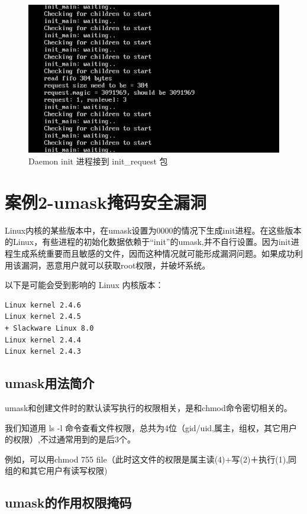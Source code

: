 \begin{figure}[htbp]
\centering
\includegraphics{./pictures/hack-init-fifo.png}
\caption{Daemon init 进程接到 init\_request 包}
\end{figure}

\section{案例2-umask掩码安全漏洞}

Linux内核的某些版本中，在umask设置为0000的情况下生成init进程。在这些版本的Linux，有些进程的初始化数据依赖于``init''的umask,并不自行设置。因为init进程生成系统重要而且敏感的文件，因而这种情况就可能形成漏洞问题。如果成功利用该漏洞，恶意用户就可以获取root权限，并破坏系统。

以下是可能会受到影响的 Linux 内核版本：

{\begin{shaded}\begin{verbatim}
Linux kernel 2.4.6
Linux kernel 2.4.5
+ Slackware Linux 8.0
Linux kernel 2.4.4
Linux kernel 2.4.3
\end{verbatim}\end{shaded}}
\subsection{umask用法简介}

umask和创建文件时的默认读写执行的权限相关，是和chmod命令密切相关的。

我们知道用 ls -l
命令查看文件权限，总共为4位（gid/uid,属主，组权，其它用户的权限）,不过通常用到的是后3个。

例如，可以用chmod 755
file（此时这文件的权限是属主读(4)+写(2)＋执行(1),同组的和其它用户有读写权限)

\subsection{umask的作用权限掩码}

